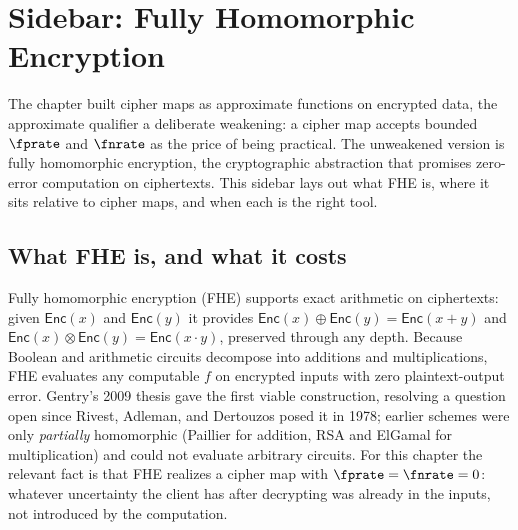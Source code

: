 %

\section{Sidebar: Fully Homomorphic Encryption}
\label{sec:fhe-sidebar}

The chapter built cipher maps as approximate functions on encrypted data,
the approximate qualifier a deliberate weakening: a cipher map accepts
bounded $\fprate$ and $\fnrate$ as the price of being practical. The
unweakened version is fully homomorphic encryption, the cryptographic
abstraction that promises zero-error computation on ciphertexts. This
sidebar lays out what FHE is, where it sits relative to cipher maps, and
when each is the right tool.

\subsection*{What FHE is, and what it costs}

Fully homomorphic encryption (FHE) supports exact arithmetic on
ciphertexts: given $\mathsf{Enc}(x)$ and $\mathsf{Enc}(y)$ it provides
$\mathsf{Enc}(x) \oplus \mathsf{Enc}(y) = \mathsf{Enc}(x + y)$ and
$\mathsf{Enc}(x) \otimes \mathsf{Enc}(y) = \mathsf{Enc}(x \cdot y)$,
preserved through any depth. Because Boolean and arithmetic circuits
decompose into additions and multiplications, FHE evaluates any
computable $f$ on encrypted inputs with zero plaintext-output error.
Gentry's 2009 thesis gave the first viable construction, resolving a
question open since Rivest, Adleman, and Dertouzos posed it in 1978;
earlier schemes were only \emph{partially} homomorphic (Paillier for
addition, RSA and ElGamal for multiplication) and could not evaluate
arbitrary circuits. For this chapter the relevant fact is that FHE
realizes a cipher map with $\fprate = \fnrate = 0$: whatever uncertainty
the client has after decrypting was already in the inputs, not introduced
by the computation.

